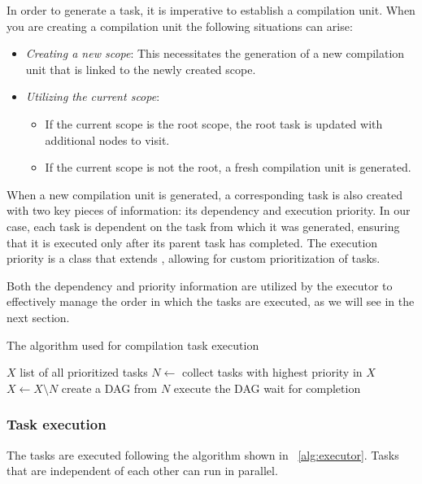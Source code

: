 In order to generate a task, it is imperative to establish a compilation unit.
When you are creating a compilation unit the following situations can arise:
\begin{itemize}
    \item \textit{Creating a new scope}: This necessitates the generation of a new compilation unit that is linked to the newly created scope.
    \item \textit{Utilizing the current scope}:
    \begin{itemize}
        \item If the current scope is the root scope, the root task is updated with additional nodes to visit.
        \item If the current scope is not the root, a fresh compilation unit is generated.
    \end{itemize}
\end{itemize}
When a new compilation unit is generated, a corresponding task is also created with two key pieces of information: its dependency and execution priority. In our case, each task is dependent on the task from which it was generated, ensuring that it is executed only after its parent task has completed. The execution priority is a class  that extends , allowing for custom prioritization of tasks.

Both the dependency and priority information are utilized by the executor to effectively manage the order in which the tasks are executed, as we will see in the next section.
\begin{algorithm}[h]
\caption{The algorithm used for compilation task execution}\label{alg:executor}
\begin{algorithmic}
\Require $X$ list of all prioritized tasks
\State $N \gets$ collect tasks with highest priority in $X$
\State $X \gets X \setminus N$
\State create a DAG from $N$
\State execute the DAG 
\State wait for completion
\EndWhile
\end{algorithmic}
\end{algorithm}

\subsubsection{Task execution}

The tasks are executed following the algorithm shown in ~\ref{alg:executor}.
Tasks that are independent of each other can run in parallel.

